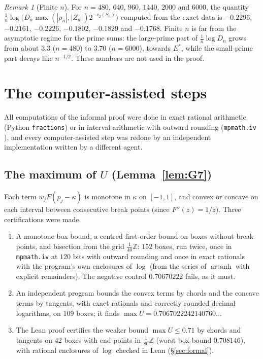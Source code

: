 \documentclass{amsart}
\theoremstyle{definition}
\theoremstyle{remark}
\newtheorem{remark}[theorem]{Remark}
\numberwithin{equation}{section}
\newcommand{\Z}{\mathbb{Z}}
\begin{document}
\begin{remark}[Finite $n$]\label{rem:finite}
For $n=480$, $640$, $960$, $1440$, $2000$ and $6000$, the quantity
$\frac1n\log\bigl(D_n\max(|\rho_n|,|Z_n|)2^{-v_2(S_n)}\bigr)$ computed from the
exact data is $-0.2296$, $-0.2161$, $-0.2226$, $-0.1802$, $-0.1829$ and
$-0.1768$. Finite $n$ is far from the asymptotic regime for the prime sums:
the large-prime part of $\frac1n\log D_n$ grows from about $3.3$ ($n=480$) to
$3.70$ ($n=6000$), towards $E^*$, while the small-prime part decays like
$n^{-1/2}$. These numbers are not used in the proof.
\end{remark}

\section{The computer-assisted steps}\label{sec:computer}

All computations of the informal proof were done in exact rational arithmetic
(Python \texttt{fractions}) or in interval arithmetic with outward rounding
(\texttt{mpmath.iv} \cite{mpmath}), and every computer-assisted step was
redone by an independent implementation written by a different agent.

\subsection{The maximum of \texorpdfstring{$U$}{U} (Lemma~\ref{lem:G7})}\label{ss:comp-U}

Each term $w_jF(p_j-\kappa)$ is monotone in $\kappa$ on $[-1,1]$, and convex
or concave on each interval between consecutive break points (since
$F''(z)=1/z$). Three certifications were made.
\begin{enumerate}
\item A monotone box bound, a centred first-order bound on boxes without break
  points, and bisection from the grid $\frac1{40}\Z$: $152$ boxes, run twice,
  once in \texttt{mpmath.iv} at $120$ bits with outward rounding and once in
  exact rationals with the program's own enclosures of $\log$ (from the series
  of $\operatorname{artanh}$ with explicit remainders). The negative control
  $0.70670222$ fails, as it must.
\item An independent program bounds the convex terms by chords and the concave
  terms by tangents, with exact rationals and correctly rounded decimal
  logarithms, on $109$ boxes; it finds $\max U=0.7067022242140760\ldots$
\item The Lean proof certifies the weaker bound $\max U\le0.71$ by chords and
  tangents on $42$ boxes with end points in $\frac1{80}\Z$ (worst box bound
  $0.708146$), with rational enclosures of $\log$ checked in Lean
  (\S\ref{sec:formal}).
\end{enumerate}
\end{document}
